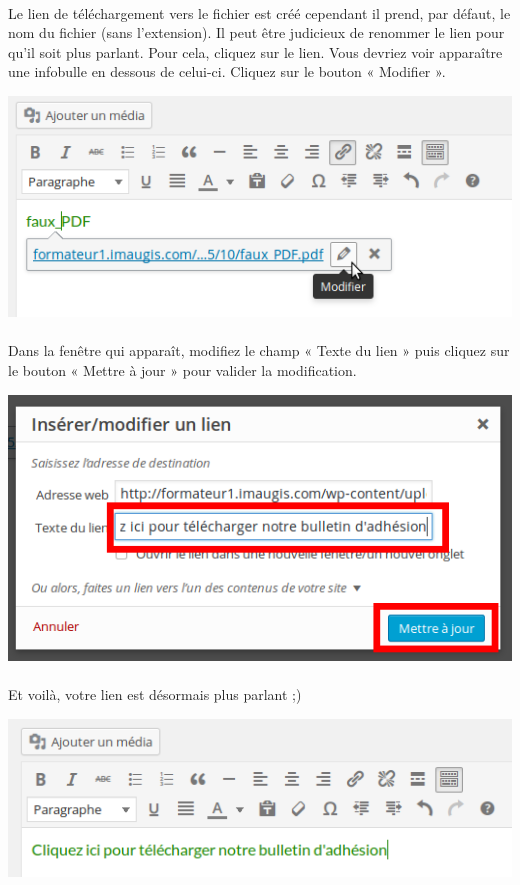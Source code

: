 \documentclass[10pt,a4paper]{article}
\begin{document}
\paragraph{}Le lien de téléchargement vers le fichier est créé cependant il prend, par défaut, le nom du fichier (sans l'extension). Il peut être judicieux de renommer le lien pour qu'il soit plus parlant. Pour cela, cliquez sur le lien. Vous devriez voir apparaître une infobulle en dessous de celui-ci. Cliquez sur le bouton « Modifier ».
\begin{center}
\includegraphics[scale=0.3]{img/0086.png}
\end{center}
\paragraph{}Dans la fenêtre qui apparaît, modifiez le champ « Texte du lien » puis cliquez sur le bouton « Mettre à jour » pour valider la modification.
\begin{center}
\includegraphics[scale=0.3]{img/0087.png}
\end{center}
\paragraph{}Et voilà, votre lien est désormais plus parlant ;)
\begin{center}
\includegraphics[scale=0.3]{img/0088.png}
\end{center}
\newpage
\end{document}
